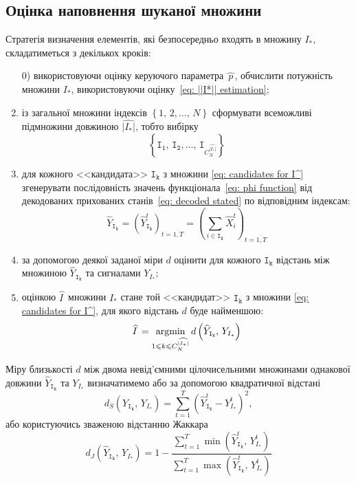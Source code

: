 \subsection{Оцінка наповнення шуканої множини}

Стратегія визначення елементів, які безпосередньо входять в множину $I_*$, складатиметься з декількох кроків:
\begin{enumerate}
    \item[0)] використовуючи оцінку керуючого параметра $\widehat{\,p\,}$, обчислити потужність множини $I_*$, використовуючи оцінку~\eqref{eq: ||I*|| estimation};
    \item із загальної множини індексів $\left\{ 1,\,2,\ldots,\,N \right\}$ сформувати всеможливі підмножини довжиною $\widehat{|I_*|}$, тобто вибірку 
    \begin{equation}\label{eq: candidates for I^}
        \left\{ \mathtt{I_1},\,\mathtt{I_2},\ldots,\,\mathtt{I}_{C^{\widehat{|I_*|}}_N} \right\}
    \end{equation}
    \item для кожного <<кандидата>> $\mathtt{I_k}$ з множини \eqref{eq: candidates for I^} згенерувати послідовність значень функціонала~\eqref{eq: phi function} від декодованих прихованих станів~\eqref{eq: decoded stated} по відповідним індексам:
    \begin{equation*}
        \widehat{Y}_{\mathtt{I_k}} = \left( \widehat{Y}^t_{\mathtt{I_k}} \right)_{t=\overline{1,T}} = \left( \sum_{i \in \mathtt{I_k}} \widehat{X}^t_i \right)_{t=\overline{1,T}}
    \end{equation*}
    \item за допомогою деякої заданої міри $d$ оцінити для кожного $\mathtt{I_k}$ відстань між множиною $\widehat{Y}_{\mathtt{I_k}}$ та сигналами $Y_{I_*}$;
    \item оцінкою $\widehat{I\,}$ множини $I_*$ стане той <<кандидат>> $\mathtt{I_k}$ з множини \eqref{eq: candidates for I^}, для якого відстань $d$ буде найменшою:
    \begin{equation}\label{eq: I^ estimation}
        \widehat{I\,} = \operatorname*{argmin}\limits_{1\leqslant k \leqslant C^{\widehat{|I_*|}}_N}{d\left( \widehat{Y}_{\mathtt{I_k}},\,Y_{I_*} \right)}
    \end{equation}
\end{enumerate}

Міру близькості $d$ між двома невід'ємними цілочисельними множинами однакової довжини $\widehat{Y}_{\mathtt{I_k}}$ та $Y_{I_*}$ визначатимемо або за допомогою квадратичної відстані
\begin{equation}\label{eq: square average distance}
    d_{S}\left( \widehat{Y}_{\mathtt{I_k}},\,Y_{I_*} \right) = \sum_{t=1}^{T}\left( \widehat{Y}^t_{\mathtt{I_k}} - Y^t_{I_*} \right)^2,
\end{equation}
або користуючись зваженою відстанню Жаккара~\cite{Chierichetti2010}
\begin{equation}\label{eq: weighted Jaccard distance}
    d_{J}\left( \widehat{Y}_{\mathtt{I_k}},\,Y_{I_*} \right) = 1 - \frac{\sum\limits_{t=1}^{T}\min{\left( \widehat{Y}^t_{\mathtt{I_k}},\,Y^t_{I_*} \right)}}{\sum\limits_{t=1}^{T}\max{\left( \widehat{Y}^t_{\mathtt{I_k}},\,Y^t_{I_*} \right)}}
\end{equation}

